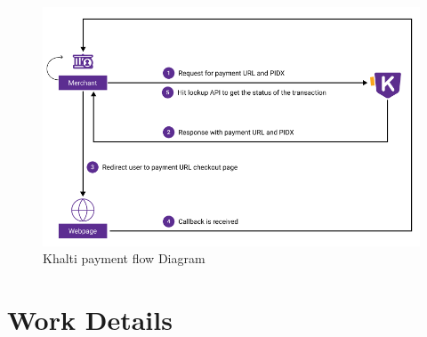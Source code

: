 \documentclass[12pt, a4paper, oneside]{article}
\begin{document}
\begin{figure}[H]
\includegraphics[width=\linewidth ]{khalti_payment_diagram}
\centering
\caption{Khalti payment flow Diagram}
\label{fig:khalti_payment_diagram}
\end{figure}

\break


\section{Work Details }
\end{document}
